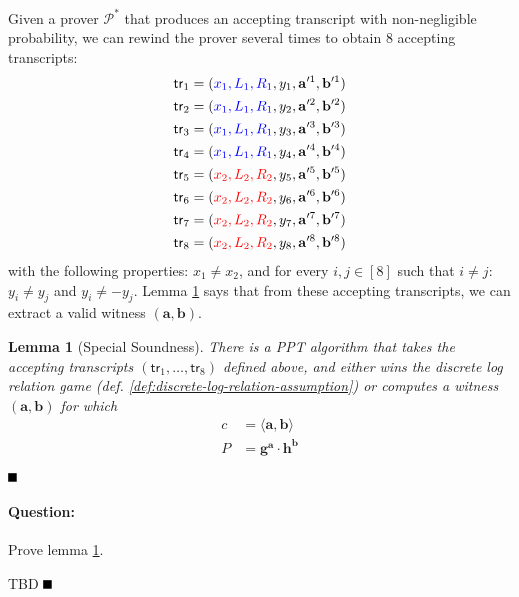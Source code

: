 \documentclass[11pt]{article}
\newtheorem{lemma}[theorem]{Lemma}
\newenvironment{solution}{\color{blue}\noindent{\bf Solution}\hspace*{1em}}{\qed\medskip}
\newcommand{\qed}{\mbox{}\hspace*{\fill}\nolinebreak\mbox{$\rule{0.6em}{0.6em}$}} %
\numberwithin{equation}{section}
\newcommand{\bfa}{\mathbf{a}}
\newcommand{\bfb}{\mathbf{b}}
\newcommand{\bfg}{\mathbf{g}}
\newcommand{\bfh}{\mathbf{h}}
\newcommand{\cP}{\mathcal{P}}
\newcommand{\tr}{\mathsf{tr}}
\begin{document}
Given a prover $\cP^*$ that produces an accepting transcript with non-negligible probability, we can rewind the prover several times to obtain 8 accepting transcripts:
\begin{align*}
    \tr_{1} &= ({\color{blue}x_1, L_1, R_1}, y_1, \bfa'^1, \bfb'^1)\\
    \tr_{2} &= ({\color{blue}x_1, L_1, R_1}, y_2, \bfa'^2, \bfb'^2)\\
    \tr_{3} &= ({\color{blue}x_1, L_1, R_1}, y_3, \bfa'^3, \bfb'^3)\\
    \tr_{4} &= ({\color{blue}x_1, L_1, R_1}, y_4, \bfa'^4, \bfb'^4)\\
    \tr_{5} &= ({\color{red}x_2, L_2, R_2}, y_5, \bfa'^5, \bfb'^5)\\
    \tr_{6} &= ({\color{red}x_2, L_2, R_2}, y_6, \bfa'^6, \bfb'^6)\\
    \tr_{7} &= ({\color{red}x_2, L_2, R_2}, y_7, \bfa'^7, \bfb'^7)\\
    \tr_{8} &= ({\color{red}x_2, L_2, R_2}, y_8, \bfa'^8, \bfb'^8)
\end{align*}
with the following properties: $x_1 \neq x_2$, and for every $i, j \in [8]$ such that $i \neq j$: $y_i \neq y_j$ and $y_i \neq -y_j$. Lemma \ref{thm:special-soundness} says that from these accepting transcripts, we can extract a valid witness $(\bfa, \bfb)$.

\begin{lemma}[Special Soundness]\label{thm:special-soundness}
There is a PPT algorithm that takes the accepting transcripts $(\tr_{1}, \dots, \tr_{8})$ defined above, and either wins the discrete log relation game (def. \ref{def:discrete-log-relation-assumption}) or computes a witness $(\bfa, \bfb)$ for which
\begin{align*}
    c &= \langle \bfa, \bfb\rangle\\
    P &= \bfg^\bfa \cdot \bfh^\bfb
\end{align*}
\end{lemma}
\qed

\paragraph{Question:} Prove lemma \ref{thm:special-soundness}.

\vspace{5mm}
\begin{solution}
TBD
\end{solution}
\end{document}
